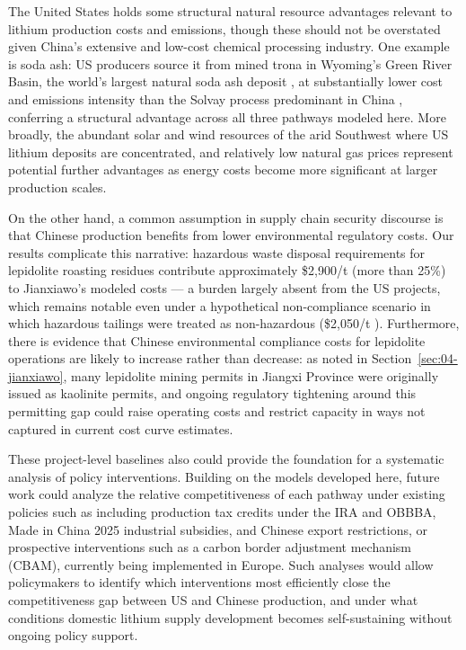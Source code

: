 The United States holds some structural natural resource advantages relevant to lithium production costs and emissions, though these should not be overstated given China's extensive and low-cost chemical processing industry. One example is soda ash: US producers source it from mined trona in Wyoming's Green River Basin, the world's largest natural soda ash deposit \cite{usgeologicalsurveyMineralCommoditySummaries2026}, at substantially lower cost and emissions intensity than the Solvay process predominant in China \cite{wangGreenhouseGasesRegulated2024, scottCanSyntheticSoda2023, royLithiumClayAssessing2024}, conferring a structural advantage across all three pathways modeled here. More broadly, the abundant solar and wind resources of the arid Southwest where US lithium deposits are concentrated, and relatively low natural gas prices represent potential further advantages as energy costs become more significant at larger production scales. 

On the other hand, a common assumption in supply chain security discourse is that Chinese production benefits from lower environmental regulatory costs. Our results complicate this narrative: hazardous waste disposal requirements for lepidolite roasting residues contribute approximately \$2,900/t  (more than 25\%) to Jianxiawo's modeled costs — a burden largely absent from the US projects, which remains notable even under a hypothetical non-compliance scenario in which hazardous tailings were treated as non-hazardous (\$2,050/t ). Furthermore, there is evidence that Chinese environmental compliance costs for lepidolite operations are likely to increase rather than decrease: as noted in Section~\ref{sec:04-jianxiawo}, many lepidolite mining permits in Jiangxi Province were originally issued as kaolinite permits, and ongoing regulatory tightening around this permitting gap \cite{benchmarkteamCATLSuspendsOperations, zhangChinaHasDomestic2025} could raise operating costs and restrict capacity in ways not captured in current cost curve estimates.

These project-level baselines also could provide the foundation for a systematic analysis of policy interventions. Building on the models developed here, future work could analyze the relative competitiveness of each pathway under existing policies such as including production tax credits under the IRA and OBBBA, Made in China 2025 industrial subsidies, and Chinese export restrictions, or prospective interventions such as a carbon border adjustment mechanism (CBAM), currently being implemented in Europe. Such analyses would allow policymakers to identify which interventions most efficiently close the competitiveness gap between US and Chinese production, and under what conditions domestic lithium supply development becomes self-sustaining without ongoing policy support.

